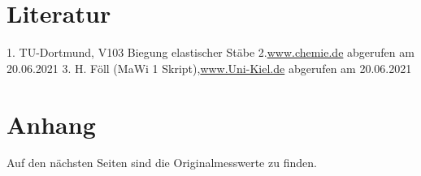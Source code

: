 \section{Literatur}
\label{sec:Literatur}
1. TU-Dortmund, V103 Biegung elastischer Stäbe
2.\hyperlink{https://www.chemie.de/lexikon/}{www.chemie.de} abgerufen am 20.06.2021
3. H. Föll (MaWi 1 Skript),\hyperlink{https://www.tf.uni-kiel.de/matwis/amat/mw1_ge/kap_7/illustr/t7_1_2.html}{www.Uni-Kiel.de} abgerufen am 20.06.2021

\section{Anhang}
\label{sec:anhang}
Auf den nächsten Seiten sind die Originalmesswerte zu finden.

